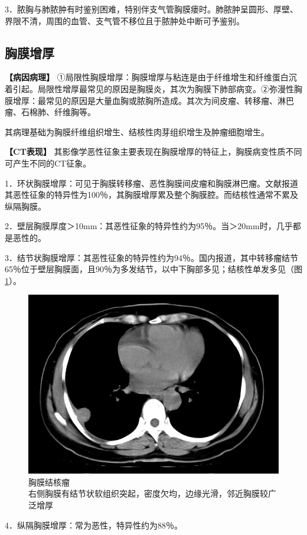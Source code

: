 3．脓胸与肺脓肿有时鉴别困难，特别伴支气管胸膜瘘时。肺脓肿呈圆形、厚壁、界限不清，周围的血管、支气管不移位且于脓肿处中断可予鉴别。

\subsection{胸膜增厚}

\textbf{【病因病理】}
①局限性胸膜增厚：胸膜增厚与粘连是由于纤维增生和纤维蛋白沉着引起。局限性增厚最常见的原因是胸膜炎，其次为胸膜下肺部病变。②弥漫性胸膜增厚：最常见的原因是大量血胸或脓胸所造成。其次为间皮瘤、转移瘤、淋巴瘤、石棉肺、纤维胸等。

其病理基础为胸膜纤维组织增生、结核性肉芽组织增生及肿瘤细胞增生。

\textbf{【CT表现】}
其影像学恶性征象主要表现在胸膜增厚的特征上，胸膜病变性质不同可产生不同的CT征象。

1．环状胸膜增厚：可见于胸膜转移瘤、恶性胸膜间皮瘤和胸膜淋巴瘤。文献报道其恶性征象的特异性为100％，其胸膜增厚累及整个胸膜腔。而结核性通常不累及纵隔胸膜。

2．壁层胸膜厚度＞10mm：其恶性征象的特异性约为95％。当＞20mm时，几乎都是恶性的。

3．结节状胸膜增厚：其恶性征象的特异性约为94％。国内报道，其中转移瘤结节65％位于壁层胸膜面，且90％为多发结节，以中下胸部多见；结核性单发多见（图\ref{fig9-44}）。

\begin{figure}[!htbp]
 \centering
 \includegraphics[width=.7\textwidth,height=\textheight,keepaspectratio]{./images/Image00242.jpg}
 \captionsetup{justification=centering}
 \caption{胸膜结核瘤\\{\small 右侧胸膜有结节状软组织突起，密度欠均，边缘光滑，邻近胸膜较广泛增厚}}
 \label{fig9-44}
  \end{figure} 

4．纵隔胸膜增厚：常为恶性，特异性约为88％。

